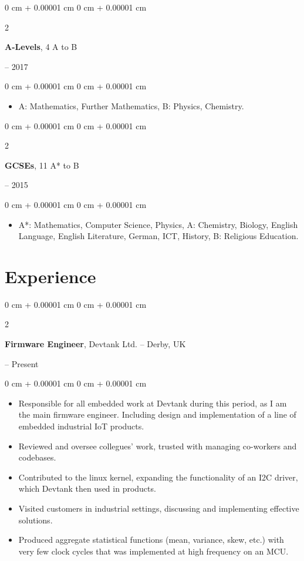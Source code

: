 \documentclass[10pt, letterpaper]{article}
\newenvironment{highlights}{
    \begin{itemize}[
        topsep=0.10 cm,
        parsep=0.10 cm,
        partopsep=0pt,
        itemsep=0pt,
        leftmargin=0 cm + 10pt
    ]
}{
    \end{itemize}
}
\newenvironment{onecolentry}{
    \begin{adjustwidth}{
        0 cm + 0.00001 cm
    }{
        0 cm + 0.00001 cm
    }
}{
    \end{adjustwidth}
}
\newenvironment{twocolentry}[2][]{
    \onecolentry
    \def\secondColumn{#2}
    \setcolumnwidth{\fill, 4.5 cm}
    \begin{paracol}{2}
}{
    \switchcolumn \raggedleft \secondColumn
    \end{paracol}
    \endonecolentry
}
\begin{document}
        \begin{twocolentry}{
            2015 – 2017
        }
            \textbf{A-Levels}, 4 A to B
        \end{twocolentry}

        \vspace{0.10 cm}
        \begin{onecolentry}
            \begin{highlights}
                \item A: Mathematics, Further Mathematics, B: Physics, Chemistry.
            \end{highlights}
        \end{onecolentry}

        \begin{twocolentry}{
            2010 – 2015
        }
            \textbf{GCSEs}, 11 A* to B
        \end{twocolentry}

        \vspace{0.10 cm}
        \begin{onecolentry}
            \begin{highlights}
                \item A*: Mathematics, Computer Science, Physics, A: Chemistry, Biology, English Language, English Literature, German, ICT, History, B: Religious Education.
            \end{highlights}
        \end{onecolentry}

    \section{Experience}
        \begin{twocolentry}{
            2022 – Present
        }
            \textbf{Firmware Engineer}, Devtank Ltd. -- Derby, UK
        \end{twocolentry}

        \vspace{0.10 cm}
        \begin{onecolentry}
            \begin{highlights}
                \item Responsible for all embedded work at Devtank during this period, as I am the main firmware engineer. Including design and implementation of a line of embedded industrial IoT products.
                \item Reviewed and oversee collegues' work, trusted with managing co-workers and codebases.
                \item Contributed to the linux kernel, expanding the functionality of an I2C driver, which Devtank then used in products.
                \item Visited customers in industrial settings, discussing and implementing effective solutions.
                \item Produced aggregate statistical functions (mean, variance, skew, etc.) with very few clock cycles that was implemented at high frequency on an MCU.
            \end{highlights}
        \end{onecolentry}
\end{document}
